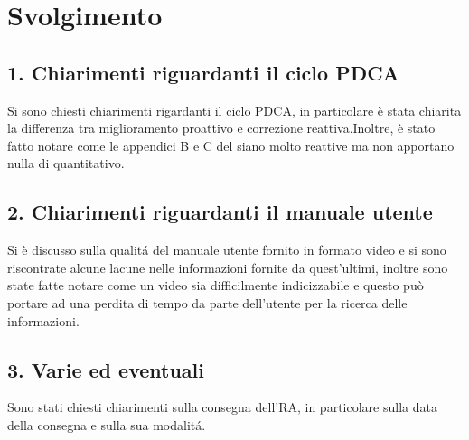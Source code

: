 \newpage
\section*{Svolgimento}
	\subsection*{1. Chiarimenti riguardanti il ciclo PDCA}
		Si sono chiesti chiarimenti rigardanti il ciclo PDCA, in particolare è stata chiarita la differenza tra miglioramento proattivo e correzione reattiva.Inoltre, è stato fatto notare come le appendici B e C del  siano molto reattive ma non apportano nulla di quantitativo.


	\subsection*{2. Chiarimenti riguardanti il manuale utente}

		Si è discusso sulla qualitá del manuale utente fornito in formato video e si sono riscontrate alcune lacune nelle informazioni fornite da quest'ultimi, inoltre sono state fatte notare come un video sia difficilmente indicizzabile e questo può portare ad una perdita di tempo da parte dell'utente per la ricerca delle informazioni.

	\subsection*{3. Varie ed eventuali}

		Sono stati chiesti chiarimenti sulla consegna dell'RA, in particolare sulla data della consegna e sulla sua modalitá.
